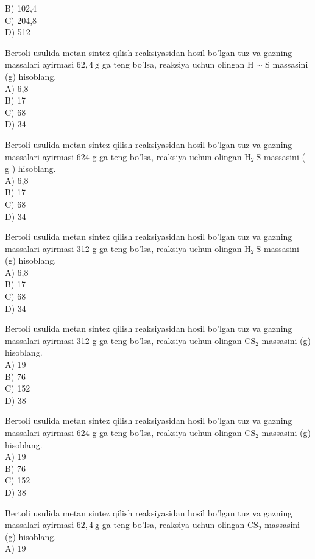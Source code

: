 B) 102,4\\
C) 204,8\\
D) 512
  \item Bertoli usulida metan sintez qilish reaksiyasidan hosil bo'lgan tuz va gazning massalari ayirmasi $62,4 \mathrm{~g}$ ga teng bo'lsa, reaksiya uchun olingan $\mathrm{H} \backsim \mathrm{S}$ massasini (g) hisoblang.\\
A) 6,8\\
B) 17\\
C) 68\\
D) 34
  \item Bertoli usulida metan sintez qilish reaksiyasidan hosil bo'lgan tuz va gazning massalari ayirmasi 624 g ga teng bo'lsa, reaksiya uchun olingan $\mathrm{H}_{2} \mathrm{~S}$ massasini ( g ) hisoblang.\\
A) 6,8\\
B) 17\\
C) 68\\
D) 34
  \item Bertoli usulida metan sintez qilish reaksiyasidan hosil bo'lgan tuz va gazning massalari ayirmasi 312 g ga teng bo'lsa, reaksiya uchun olingan $\mathrm{H}_{2} \mathrm{~S}$ massasini (g) hisoblang.\\
A) 6,8\\
B) 17\\
C) 68\\
D) 34
  \item Bertoli usulida metan sintez qilish reaksiyasidan hosil bo'lgan tuz va gazning massalari ayirmasi 312 g ga teng bo'lsa, reaksiya uchun olingan $\mathrm{CS}_{2}$ massasini (g) hisoblang.\\
A) 19\\
B) 76\\
C) 152\\
D) 38
  \item Bertoli usulida metan sintez qilish reaksiyasidan hosil bo'lgan tuz va gazning massalari ayirmasi 624 g ga teng bo'lsa, reaksiya uchun olingan $\mathrm{CS}_{2}$ massasini (g) hisoblang.\\
A) 19\\
B) 76\\
C) 152\\
D) 38
  \item Bertoli usulida metan sintez qilish reaksiyasidan hosil bo'lgan tuz va gazning massalari ayirmasi $62,4 \mathrm{~g}$ ga teng bo'lsa, reaksiya uchun olingan $\mathrm{CS}_{2}$ massasini (g) hisoblang.\\
A) 19\\

